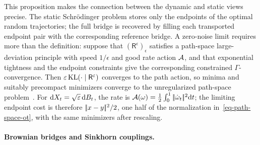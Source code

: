 This proposition makes the connection between the dynamic and static views precise. The static Schr\"odinger problem stores only the endpoints of the optimal random trajectories; the full bridge is recovered by filling each transported endpoint pair with the corresponding reference bridge. A zero-noise limit requires more than the definition: suppose that $(\mathsf R^\epsilon)_\epsilon$ satisfies a path-space large-deviation principle with speed $1/\epsilon$ and good rate action $\mathcal{A}$, and that exponential tightness and the endpoint constraints give the corresponding constrained $\Gamma$-convergence. Then $\varepsilon\operatorname{KL}(\cdot\mid\mathsf R^\varepsilon)$ converges to the path action, so minima and suitably precompact minimizers converge to the unregularized path-space problem~\cite{leonard2012schrodinger}. For $\mathrm{d} X_t=\sqrt{\varepsilon}\,\mathrm{d} B_t$, the rate is $\mathcal{A}(\omega)=\tfrac12\int_0^1|\!| \dot\omega_t |\!|^2\mathrm{d} t$; the limiting endpoint cost is therefore $|\!| x-y |\!|^2/2$, one half of the normalization in~\eqref{eq-path-space-ot}, with the same minimizers after rescaling.

\paragraph{Brownian bridges and Sinkhorn couplings.}

